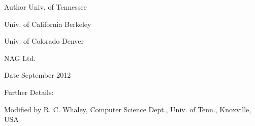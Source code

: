 \begin{DoxyAuthor}{Author}
Univ. of Tennessee 

Univ. of California Berkeley 

Univ. of Colorado Denver 

N\+A\+G Ltd. 
\end{DoxyAuthor}
\begin{DoxyDate}{Date}
September 2012 
\end{DoxyDate}
\begin{DoxyParagraph}{Further Details\+: }
\begin{DoxyVerb}  Modified by
   R. C. Whaley, Computer Science Dept., Univ. of Tenn., Knoxville, USA\end{DoxyVerb}
 
\end{DoxyParagraph}
